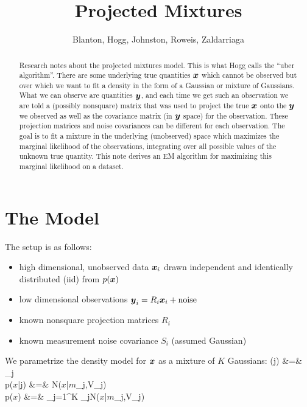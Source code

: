 \documentclass{article}
\def\beqa#1\eeqa{\begin{eqnarray}#1\end{eqnarray}}
\newcommand{\bv}[1]{\mbox{\boldmath ${#1}$}} %
\newcommand{\<}{\langle}
\renewcommand{\>}{\rangle}
\newcommand{\xx}{\bv{x}}
\newcommand{\yy}{\bv{y}}
\newcommand{\yyi}{\bv{y}_i}
\newcommand{\xxi}{\bv{x}_i}
\newcommand{\RRi}{R_i}
\newcommand{\SSi}{S_i}
\newcommand{\VVj}{V_j}
\newcommand{\mmj}{\bv{m}_j}
\newcommand{\alphaj}{\alpha_j}
\begin{document}

\title{\bf Projected Mixtures}

\author{Blanton, Hogg, Johnston, Roweis, Zaldarriaga}

\maketitle


\begin{abstract}
Research notes about the projected mixtures model.
This is what Hogg calls the ``uber algorithm''. There are some
underlying true quantities $\xx$ which cannot be observed but over which we
want to fit a density in the form of a Gaussian or mixture of
Gaussians. What we can observe are quantities $\yy$, and each time we
get such an observation we are told a (possibly nonsquare) matrix that
was used to project the true $\xx$ onto the $\yy$ we observed as well
as the covariance matrix (in $\yy$ space) for the observation. These
projection matrices and noise covariances can be different for each
observation. The goal is to fit a mixture in the underlying
(unobserved) space which maximizes the marginal likelihood of the
observations, integrating over all possible values of the unknown true
quantity. This note derives an EM algorithm for maximizing this
marginal likelihood on a dataset.
\end{abstract}

\section{The Model}
The setup is as follows:
\begin{itemize}
\item high dimensional, unobserved data $\xxi$ drawn independent and
identically distributed (iid) from $p(\xx)$
\item low dimensional observations $\yyi=\RRi \xxi + \mathrm{noise}$
\item known nonsquare projection matrices $\RRi$
\item known measurement noise covariance $\SSi$ (assumed Gaussian)
\end{itemize}

We parametrize the density model for $\xx$ as a mixture of $K$
Gaussians:
\beqa
p(j) &=& \alphaj\\
p(\xx|j) &=& {\cal N}(\xx|\mmj,\VVj)\\
p(\xx) &=& \sum_{j=1}^K \alphaj {\cal N}(\xx|\mmj,\VVj)
\eeqa
\end{document}
